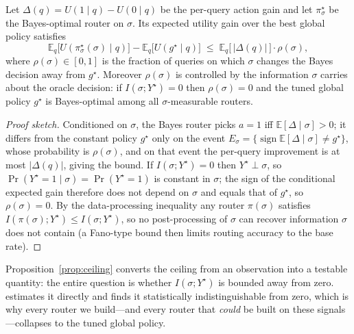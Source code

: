 \begin{proposition}
\label{prop:ceiling}
Let $\Delta(q)=U(1\mid q)-U(0\mid q)$ be the per-query action gain and let $\pi^\star_\sigma$ be the Bayes-optimal router on $\sigma$. Its expected utility gain over the best global policy satisfies
\[
\mathbb{E}_q\!\big[U(\pi^\star_\sigma(\sigma)\mid q)\big]-\mathbb{E}_q\!\big[U(g^\star\mid q)\big]
\;\le\; \mathbb{E}_q\big[\,|\Delta(q)|\,\big]\cdot \rho(\sigma),
\]
where $\rho(\sigma)\in[0,1]$ is the fraction of queries on which $\sigma$ changes the Bayes decision away from $g^\star$. Moreover $\rho(\sigma)$ is controlled by the information $\sigma$ carries about the oracle decision: if $I(\sigma;Y^\star)=0$ then $\rho(\sigma)=0$ and the tuned global policy $g^\star$ is Bayes-optimal among all $\sigma$-measurable routers.
\end{proposition}

\begin{proof}[Proof sketch]
Conditioned on $\sigma$, the Bayes router picks $a{=}1$ iff $\mathbb{E}[\Delta\mid\sigma]>0$; it differs from the constant policy $g^\star$ only on the event $E_\sigma=\{\operatorname{sign}\mathbb{E}[\Delta\mid\sigma]\neq g^\star\}$, whose probability is $\rho(\sigma)$, and on that event the per-query improvement is at most $|\Delta(q)|$, giving the bound. If $I(\sigma;Y^\star)=0$ then $Y^\star\perp\sigma$, so $\Pr(Y^\star{=}1\mid\sigma)=\Pr(Y^\star{=}1)$ is constant in $\sigma$; the sign of the conditional expected gain therefore does not depend on $\sigma$ and equals that of $g^\star$, so $\rho(\sigma)=0$. By the data-processing inequality any router $\pi(\sigma)$ satisfies $I(\pi(\sigma);Y^\star)\le I(\sigma;Y^\star)$, so no post-processing of $\sigma$ can recover information $\sigma$ does not contain (a Fano-type bound then limits routing accuracy to the base rate).
\end{proof}

Proposition~\ref{prop:ceiling} converts the ceiling from an observation into a testable quantity: the entire question is whether $I(\sigma;Y^\star)$ is bounded away from zero.  estimates it directly and finds it statistically indistinguishable from zero, which is why every router we build---and every router that \emph{could} be built on these signals---collapses to the tuned global policy.
